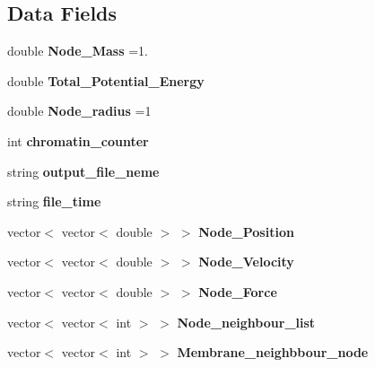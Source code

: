 \subsection*{Data Fields}
\begin{DoxyCompactItemize}
\item 
double {\bfseries Node\+\_\+\+Mass} =1.\hypertarget{classChromatin_a926ccfa22147b39cd04b49c2b68c07c2}{}\label{classChromatin_a926ccfa22147b39cd04b49c2b68c07c2}

\item 
double {\bfseries Total\+\_\+\+Potential\+\_\+\+Energy}\hypertarget{classChromatin_a6230e21b70b3d66a4108dbad1dc6298f}{}\label{classChromatin_a6230e21b70b3d66a4108dbad1dc6298f}

\item 
double {\bfseries Node\+\_\+radius} =1\hypertarget{classChromatin_acf302f81b89cef7cda7be41c16338867}{}\label{classChromatin_acf302f81b89cef7cda7be41c16338867}

\item 
int {\bfseries chromatin\+\_\+counter}\hypertarget{classChromatin_a80fcd33b94a68ab897f9e6b1340c87db}{}\label{classChromatin_a80fcd33b94a68ab897f9e6b1340c87db}

\item 
string {\bfseries output\+\_\+file\+\_\+neme}\hypertarget{classChromatin_adb1e1eaa1f22fd6b84558c03bfa58328}{}\label{classChromatin_adb1e1eaa1f22fd6b84558c03bfa58328}

\item 
string {\bfseries file\+\_\+time}\hypertarget{classChromatin_ab3ea56851de82ce78217bec9d4b7b46a}{}\label{classChromatin_ab3ea56851de82ce78217bec9d4b7b46a}

\item 
vector$<$ vector$<$ double $>$ $>$ {\bfseries Node\+\_\+\+Position}\hypertarget{classChromatin_ae073b0e38ca1cd23a0bb313a3651e6f5}{}\label{classChromatin_ae073b0e38ca1cd23a0bb313a3651e6f5}

\item 
vector$<$ vector$<$ double $>$ $>$ {\bfseries Node\+\_\+\+Velocity}\hypertarget{classChromatin_aed0728874c6204dd38e59dd6c008a160}{}\label{classChromatin_aed0728874c6204dd38e59dd6c008a160}

\item 
vector$<$ vector$<$ double $>$ $>$ {\bfseries Node\+\_\+\+Force}\hypertarget{classChromatin_a263c3a9e051dea350964914691a33af7}{}\label{classChromatin_a263c3a9e051dea350964914691a33af7}

\item 
vector$<$ vector$<$ int $>$ $>$ {\bfseries Node\+\_\+neighbour\+\_\+list}\hypertarget{classChromatin_a881c463296819b2dc82e04817ae65491}{}\label{classChromatin_a881c463296819b2dc82e04817ae65491}

\item 
vector$<$ vector$<$ int $>$ $>$ {\bfseries Membrane\+\_\+neighbbour\+\_\+node}\hypertarget{classChromatin_ad815867e6a33224f5d9a756b5d81dc5d}{}\label{classChromatin_ad815867e6a33224f5d9a756b5d81dc5d}

\end{DoxyCompactItemize}


